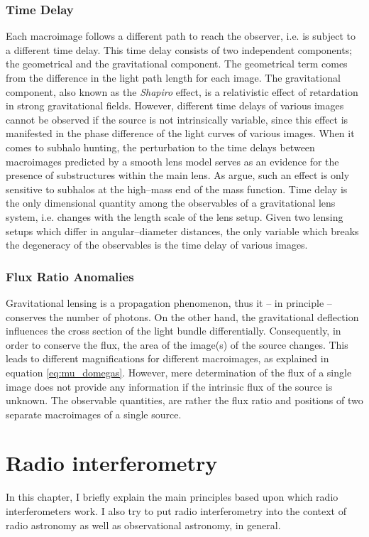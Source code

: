 \documentclass[a4wide,12pt]{book}
\begin{document}
\subsection{Time Delay}
Each macroimage follows a different path to reach the observer, i.e. is subject to a different time delay. This time delay consists of two independent components; the geometrical and the gravitational component. The geometrical term comes from the difference in the light path length for each image. The gravitational component, also known as the \emph{Shapiro} effect, is a relativistic effect of retardation in strong gravitational fields. However, different time delays of various images cannot be observed if the source is not intrinsically variable, since this effect is manifested in the phase difference of the light curves of various images. When it comes to subhalo hunting, the perturbation to the time delays between macroimages predicted by a smooth lens model serves as an evidence for the presence of substructures within the main lens. As \citet{Moustakas+2009} argue, such an effect is only sensitive to subhalos at the high--mass end of the mass function. Time delay is the only dimensional quantity among the observables of a gravitational lens system, i.e. changes with the length scale of the lens setup. Given two lensing setups which differ in angular--diameter distances, the only variable which breaks the degeneracy of the observables is the time delay of various images.
  
\subsection{Flux Ratio Anomalies}
\label{subsec:Flux Ratio Anomalies}
Gravitational lensing is a propagation phenomenon, thus it -- in principle -- conserves the number of photons. On the other hand, the gravitational deflection influences the cross section of the light bundle differentially. Consequently, in order to conserve the flux, the area of the image(s) of the source changes. This leads to different magnifications for different macroimages, as explained in equation \ref{eq:mu_domegas}. However, mere determination of the flux of a single image does not provide any information if the intrinsic flux of the source is unknown. The observable quantities, are rather the flux ratio and positions of two separate macroimages of a single source.

\chapter{Radio interferometry}
In this chapter, I briefly explain the main principles based upon which radio interferometers work. I also try to put radio interferometry into the context of radio astronomy as well as observational astronomy, in general.
\end{document}
